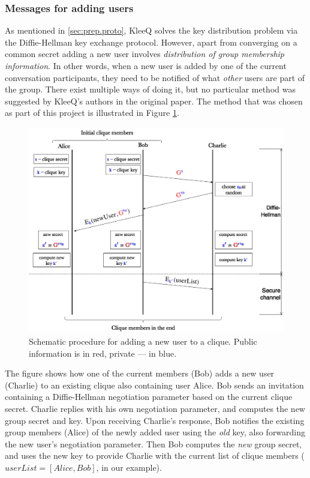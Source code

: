 \documentclass[a4paper, twoside, 12pt]{report}
\begin{document}
\subsubsection{Messages for adding users}
As mentioned in \cref{sec:prep.proto}, KleeQ solves the key distribution problem via the Diffie-Hellman key exchange protocol. However, apart from converging on a common secret adding a new user involves \emph{distribution of group membership information}. In other words, when a new user is added by one of the current conversation participants, they need to be notified of what \emph{other} users are part of the group. There exist multiple ways of doing it, but no particular method was suggested by KleeQ's authors in the original paper. The method that was chosen as part of this project is illustrated in Figure \ref{fig:CliqueFormation}.
\begin{figure}[H]
    \captionsetup{width=0.76\textwidth}
    \centering
    \includegraphics[width=0.76\linewidth]{pics/CliqueFormation.png}
    \caption{\label{fig:CliqueFormation} Schematic procedure for adding a new user to a clique. Public information is in {\color{red} red}, private --- in {\color{blue} blue}.}
\end{figure}
The figure shows how one of the current members (Bob) adds a new user (Charlie) to an existing clique also containing user Alice. Bob sends an invitation containing a Diffie-Hellman negotiation parameter based on the current clique secret. Charlie replies with his own negotiation parameter, and computes the new group secret and key. Upon receiving Charlie's response, Bob notifies the existing group members (Alice) of the newly added user using the \emph{old} key, also forwarding the new user's negotiation parameter. Then Bob computes the \emph{new} group secret, and uses the new key to provide Charlie with the current list of clique members ($userList = [Alice, Bob]$, in our example). \\
\end{document}
